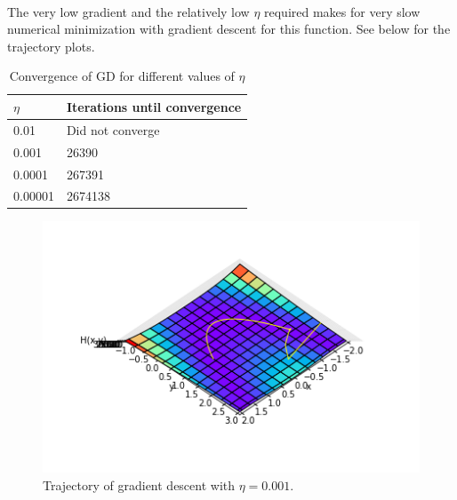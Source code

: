 \documentclass[a4paper,11pt]{article}
\theoremstyle{mytheor}
\begin{document}
\begin{enumerate}
		\\
		The very low gradient and the relatively low $\eta$ required makes for very slow numerical minimization with gradient descent for this function. See below for the trajectory plots.
 
		\begin{table}[h!]
			\centering
			\caption{Convergence of GD for different values of $\eta$}
			\label{conver}
			\begin{tabular}{p{2cm} | p{4.5cm}}
				$\eta$    & Iterations until convergence \\ \hline
				0.01    & Did not converge             \\
				0.001   & 26390                        \\
				0.0001  & 267391                       \\
				0.00001 & 2674138               
			\end{tabular}
		\end{table}\vspace{-0.5cm}
 
		\begin{figure}[h!]
			 \centering
   \includegraphics[scale=0.92]{trajectory0001y26390}\vspace{-1.9cm}
   \caption{\vspace{-0.2cm} Trajectory of gradient descent with $\eta = 0.001$.\vspace{-0.3cm}}
  \end{figure}\vspace{-0.5cm}
 

\end{enumerate}
\end{document}
